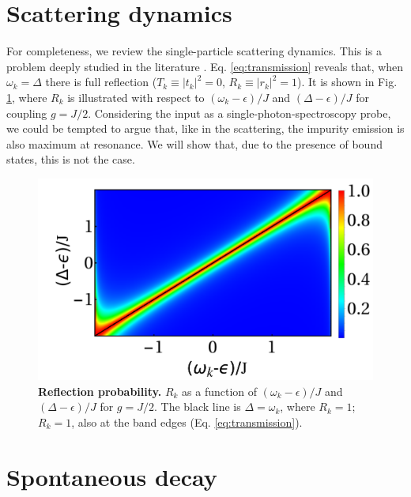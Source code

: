 \documentclass[aps,pra,twocolumn,floatfix,superscriptaddress]{revtex4-1}%
\begin{document}
\section{Scattering dynamics}\label{sec:scatt}
For completeness, we review the single-particle scattering dynamics. This is a problem deeply studied in the literature \cite{Nori2008a, Fan2005a, Fan2005b, Guinea1987,Roy2016}.
Eq. \eqref{eq:transmission} reveals that, 
 when $\omega_k=\Delta$ there is full reflection ($T_k\equiv |t_k|^2=0$, $R_k\equiv |r_k|^2 = 1$). 
It is shown in Fig. \ref{fig:R}, where $R_k$ is illustrated with respect to $(\omega_k-\epsilon)/J$ and $(\Delta-\epsilon)/J$ for coupling $g=J/2$. 
Considering the  input as a single-photon-spectroscopy probe, we could be tempted to argue that, like in the scattering, the impurity emission is also maximum at resonance.  We will show that, due to the presence of bound states, this is not the case. 

\begin{figure}[thb!]
\begin{center}
\includegraphics[width=1.\columnwidth]{R_vs_w_Delta_g_0_5.pdf}
\caption{{\bf Reflection probability.} $R_k$ as a function of $(\omega_k-\epsilon)/J$ and $(\Delta-\epsilon)/J$ for $g=J/2$. The black line is $\Delta=\omega_k$, where $R_k=1$; $R_k=1$, also at the band edges (Eq. \eqref{eq:transmission}).}\label{fig:R}
\end{center}
\end{figure}


\section{Spontaneous decay}\label{sec:spontaneous_decay}
\end{document}
